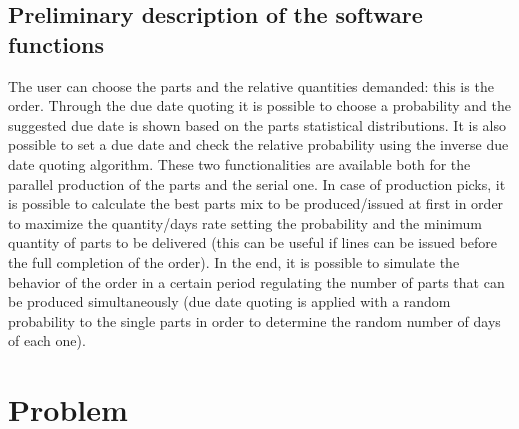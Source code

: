 \documentclass[a4paper,12pt]{article}
\begin{document}
\subsection{Preliminary description of the software functions} 

The user can choose the parts and the relative quantities demanded: this is the order. Through the due date quoting it is possible to choose a probability and the suggested due date is shown based on the parts statistical distributions. It is also possible to set a due date and check the relative probability using the inverse due date quoting algorithm. These two functionalities are available both for the parallel production of the parts and the serial one. In case of production picks, it is possible to calculate the best parts mix to be produced/issued at first in order to maximize the quantity/days rate setting the probability and the minimum quantity of parts to be delivered (this can be useful if lines can be issued before the full completion of the order). In the end, it is possible to simulate the behavior of the order in a certain period regulating the number of parts that can be produced simultaneously (due date quoting is applied with a random probability to the single parts in order to determine the random number of days of each one).

\newpage
\section{Problem}
\end{document}
